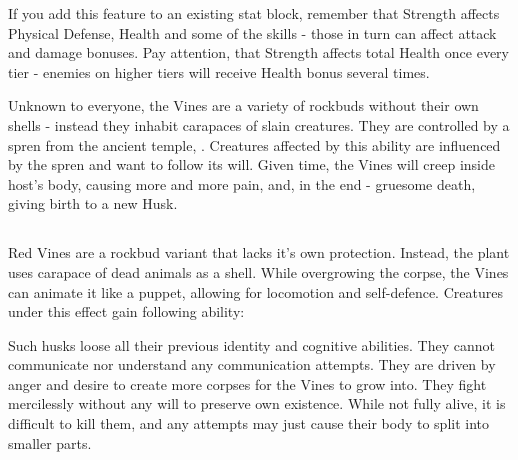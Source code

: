 \abilityVines{}

If you add this feature to an existing stat block, remember that Strength affects Physical Defense, Health and some of the skills - those in turn can affect attack and damage bonuses. Pay attention, that Strength affects total Health once every tier - enemies on higher tiers will receive Health bonus several times.

Unknown to everyone, the Vines are a variety of rockbuds without their own shells - instead they inhabit carapaces of slain creatures. They are controlled by a spren from the ancient temple, \npcSprenVines{}. Creatures affected by this ability are influenced by the spren and want to follow its will. Given time, the Vines will creep inside host's body, causing more and more pain, and, in the end - gruesome death, giving birth to a new Husk.



\subsection{\abilityHuskName}
\label{ssec:ruleHusk}

Red Vines are a rockbud variant that lacks it's own protection. Instead, the plant uses carapace of dead animals as a shell. While overgrowing the corpse, the Vines can animate it like a puppet, allowing for locomotion and self-defence. Creatures under this effect gain following ability:

\abilityHusk{}
\newpage %

Such husks loose all their previous identity and cognitive abilities. They cannot communicate nor understand any communication attempts. They are driven by anger and desire to create more corpses for the Vines to grow into. They fight mercilessly without any will to preserve own existence. While not fully alive, it is difficult to kill them, and any attempts may just cause their body to split into smaller parts. 

